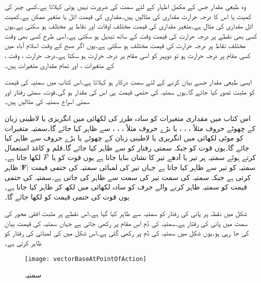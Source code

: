وہ طبعی مقدار جس کے مکمل اظہار کے لئے سمت کی ضرورت نہیں ہوتی  کہلاتا ہے۔کسی چیز کی کمیت  یا اس کا درجہ حرارت  مقداری کی مثالیں ہیں۔مقداری کی قیمت اٹل یا متغیر ممکن ہے۔کمیت اٹل مقداری کی مثال ہے۔متغیر مقداری کی قیمت مختلف اوقات اور نقاط پر مختلف ہو سکتی ہے۔یوں کسی بھی نقطے پر درجہ حرارت کی قیمت وقت  کے ساتھ تبدیل ہو سکتی ہے۔اسی طرح کسی بھی وقت مختلف نقاط پر درجہ حرارت کی قیمت مختلف ہو سکتی ہے۔یوں اگر صبح  کے وقت اسلام آباد میں کسی مقام پر درجہ حرارت  ہو تو دوپہر کو اسی مقام پر درجہ حرارت  ہو سکتا ہے۔درجہ حرارت ، وقت ،   کے متغیرات  ،  اور  تمام مقداری متغیرات ہیں۔

ایسی طبعی مقدار جسے بیان کرنے کے لئے سمت درکار ہو  کہلاتا ہے۔اس کتاب میں سمتیہ کی قیمت کو مثبت تصور کیا جائے گا۔یوں سمتیہ کی حتمی قیمت ہی اس کی مقدار ہو گی۔قوت، سمتی رفتار اور سمتی اسراع سمتیہ کی مثالیں ہیں۔

اس کتاب میں مقداری متغیرات کو سادہ طرز کی لکھائی میں انگریزی یا لاطینی زبان کے  چھوٹے حروف مثلاً ، ، ،
  یا بڑے حروف مثلاً ، ، ،   سے ظاہر کیا جائے گا۔سمتیہ متغیرات کو موٹی لکھائی میں انگریزی یا لاطینی زبان کے  چھوٹے  یا بڑے حروف  سے ظاہر کیا جائے گا۔یوں قوت  کو  جبکہ سمتی رفتار کو  سے ظاہر کیا جائے گا۔قلم و کاغذ استعمال کرتے ہوئے سمتیہ پر تیر  یا آدھے تیر کا نشان بنایا جاتا ہے یوں قوت کو  یا
$\overset{\rightharpoonup}{\rule{0pt}{.9ex}\smash{F}}$
لکھا جاتا ہے۔سمتیہ کو تیر سے ظاہر کیا جاتا ہے جہاں تیر کی لمبائی سمتیہ کی حتمی قیمت $\abs{\bf{F}}$  ظاہر کرتی ہے جبکہ سمتیہ کی سمت تیر کی سمت  سے ظاہر کی جاتی ہے۔سمتیہ کی حتمی قیمت کو سمتیہ ظاہر کرنے والے حرف کو سادہ لکھائی میں لکھ کر ظاہر کیا جاتا ہے۔یوں قوت   کی حتمی قیمت  کو  لکھا جائے گا۔

شکل  میں نقطہ  پر پانی کی رفتار کو سمتیہ  سے ظاہر کیا گیا ہے۔اس نقطے پر مثبت افقی محور کی سمت میں پانی کی رفتار  ہے۔سمتیہ کی دُم اس مقام پر رکھی جاتی ہے جہاں سمتیہ کی قیمت بیان کی جا رہی ہو۔یوں شکل میں سمتیہ کی دُم   پر رکھی گئی ہے۔اس شکل میں  کی لمبائی  کی رفتار کو ظاہر کرتی ہے۔
\begin{figure}
\centering
\texttt{[image: vectorBaseAtPointOfAction]}
\caption{سمتیہ}
\label{شکل_سمتیہ_دم_پر_عمل_درامد_ہوتی_ہے}
\end{figure}

